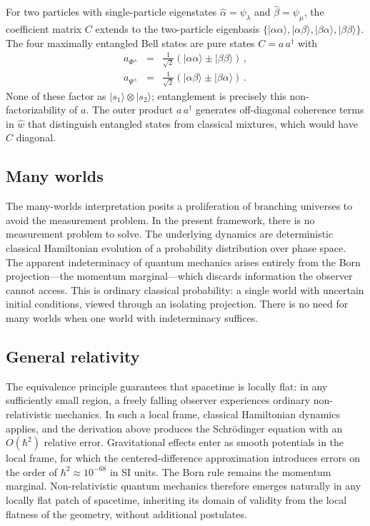 \documentclass[prb,preprint]{revtex4-1}
\begin{document}
For two particles with single-particle eigenstates $\hat{\alpha}=\psi_{\lambda}$ and $\hat{\beta}=\psi_\mu$, the coefficient matrix $C$ extends to the two-particle eigenbasis $\{|\alpha\alpha\rangle, |\alpha\beta\rangle, |\beta\alpha\rangle, |\beta\beta\rangle\}$.  The four maximally entangled Bell states are pure states $C = a\,a^\dagger$ with
\begin{eqnarray}
a_{\Phi^{\pm}} &=& \tfrac{1}{\sqrt{2}}(|\alpha\alpha\rangle \pm |\beta\beta\rangle) \,,\\
a_{\Psi^{\pm}} &=& \tfrac{1}{\sqrt{2}}(|\alpha\beta\rangle \pm |\beta\alpha\rangle) \,.
\end{eqnarray}
None of these factor as $|s_1\rangle \otimes |s_2\rangle$; entanglement is precisely this non-factorizability of $a$.  The outer product $a\,a^\dagger$ generates off-diagonal coherence terms in $\hat{w}$ that distinguish entangled states from classical mixtures, which would have $C$ diagonal.

\subsection{Many worlds}

The many-worlds interpretation\cite{everett1957} posits a proliferation of branching universes to avoid the measurement problem.  In the present framework, there is no measurement problem to solve.  The underlying dynamics are deterministic classical Hamiltonian evolution of a probability distribution over phase space.  The apparent indeterminacy of quantum mechanics arises entirely from the Born projection---the momentum marginal---which discards information the observer cannot access.  This is ordinary classical probability: a single world with uncertain initial conditions, viewed through an isolating projection.  There is no need for many worlds when one world with indeterminacy suffices.

\subsection{General relativity}

The equivalence principle guarantees that spacetime is locally flat: in any sufficiently small region, a freely falling observer experiences ordinary non-relativistic mechanics.  In such a local frame, classical Hamiltonian dynamics applies, and the derivation above produces the Schr\"odinger equation with an $O(\hbar^2)$ relative error.  Gravitational effects enter as smooth potentials in the local frame, for which the centered-difference approximation introduces errors on the order of $\hbar^2 \approx 10^{-68}$ in SI units.  The Born rule remains the momentum marginal.  Non-relativistic quantum mechanics therefore emerges naturally in any locally flat patch of spacetime, inheriting its domain of validity from the local flatness of the geometry, without additional postulates.
\end{document}
